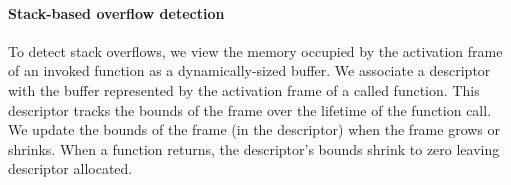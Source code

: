 \documentclass[letterpaper,twocolumn,10pt]{article}
\newcommand{\comment}[1]{}
\begin{document}




\paragraph{Stack-based overflow detection}

To detect stack overflows, we view the memory occupied by the activation frame of an invoked function as a dynamically-sized buffer. %
We associate a descriptor with the buffer represented by the activation frame of a called function. This descriptor tracks the bounds of the frame over the lifetime of the function call. We update the bounds of the frame (in the descriptor) when the frame grows or shrinks. When a function returns, the descriptor's bounds shrink to zero leaving descriptor allocated.%
\end{document}
